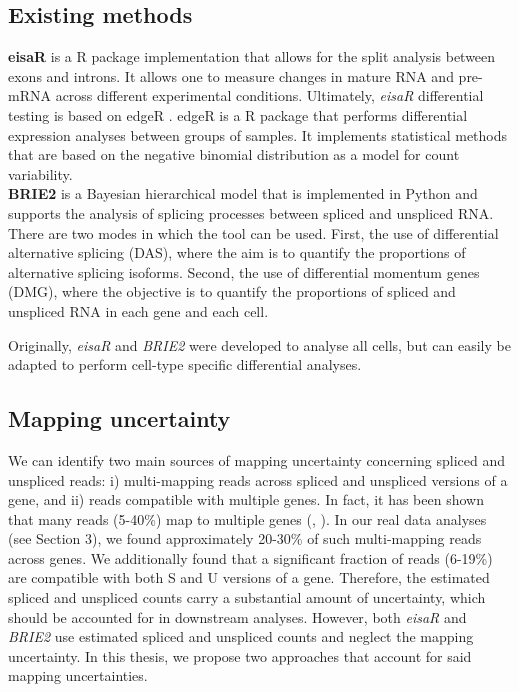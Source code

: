 \subsection{Existing methods}

\textbf{eisaR} \citep{eisar_package} is a R package implementation that allows for the split analysis between exons and introns. It allows one to measure changes in mature RNA and pre-mRNA across different experimental conditions. Ultimately, \emph{eisaR} differential testing is based on edgeR \citep{edger_package}. edgeR is a R package that performs differential expression analyses between groups of samples. It implements statistical methods that are based on the negative binomial distribution as a model for count variability. \\

\noindent \textbf{BRIE2} \citep{brie2} is a Bayesian hierarchical model that is implemented in Python and supports the analysis of splicing processes between spliced and unspliced RNA. There are two modes in which the tool can be used. First, the use of differential alternative splicing (DAS), where the aim is to quantify the proportions of alternative splicing isoforms. Second, the use of differential momentum genes (DMG), where the objective is to quantify the proportions of spliced and unspliced RNA in each gene and each cell.

Originally, \emph{eisaR} and \emph{BRIE2} were developed to analyse all cells, but can easily be adapted to perform cell-type specific differential analyses.

\subsection{Mapping uncertainty}
We can identify two main sources of mapping uncertainty concerning spliced and unspliced reads: i) multi-mapping reads across spliced and unspliced versions of a gene, and ii) reads compatible with multiple genes. In fact, it has been shown that many reads (5-40\%) map to multiple genes (\cite{mapping1}, \cite{mapping2}). In our real data analyses (see Section 3), we found approximately 20-30\% of such multi-mapping reads across genes. We additionally found that a significant fraction of reads (6-19\%) are compatible with both S and U versions of a gene. Therefore, the estimated spliced and unspliced counts carry a substantial amount of uncertainty, which should be accounted for in downstream analyses. However, both \emph{eisaR} and \emph{BRIE2} use estimated spliced and unspliced counts and neglect the mapping uncertainty. In this thesis, we propose two approaches that account for said mapping uncertainties.

